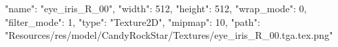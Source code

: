 {
  "name": "eye_iris_R_00",
  "width": 512,
  "height": 512,
  "wrap_mode": 0,
  "filter_mode": 1,
  "type": "Texture2D",
  "mipmap": 10,
  "path": "Resources/res/model/CandyRockStar/Textures/eye_iris_R_00.tga.tex.png"
}